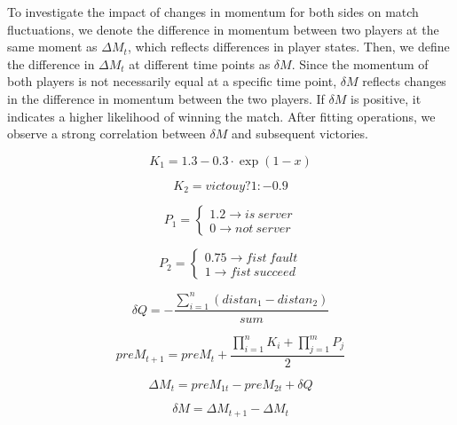 \documentclass[12pt]{article}
\begin{document}
To investigate the impact of changes in momentum for both sides on match fluctuations, we denote the difference in momentum between two players at the same moment as $\Delta M_t$, which reflects differences in player states. Then, we define the difference in $\Delta M_t$ at different time points as $\delta M$. Since the momentum of both players is not necessarily equal at a specific time point, $\delta M$ reflects changes in the difference in momentum between the two players. If $\delta M$ is positive, it indicates a higher likelihood of winning the match. After fitting operations, we observe a strong correlation between $\delta M$ and subsequent victories.

\begin{equation}\label{eq:k1}
K_1=1.3-0.3\cdot\exp\left(1-x\right)
\end{equation}

\begin{equation}\label{eq:k2}
K_2=victouy?1:-0.9
\end{equation}

\begin{equation}\label{eq:p1}
P_1=\left\{
\begin{aligned}
1.2 \to is \ server\\
0 \to not \ server 
\end{aligned}
\right.
\end{equation}

\begin{equation}\label{eq:p2}
P_2 = \left\{
\begin{aligned}
0.75 \to fist \ fault \\
1 \to fist \ succeed 
\end{aligned}
\right.
\end{equation}

\begin{equation}\label{eq:dq}
\delta Q =- \frac {\sum\limits_{i=1}^n (distan_1-distan_2)}{sum}
\end{equation}

\begin{equation}\label{eq:preM}
preM_{t+1}=preM_{t}+\frac{\prod\limits_{i=1}^n K_i+\prod\limits_{j=1}^m P_j}{2}
\end{equation}

\begin{equation}\label{eq:DELM}
\Delta M_t = preM_{1t} - preM _{2t}+\delta Q
\end{equation}

\begin{equation}\label{eq:dDELM}
 \delta M = \Delta M_{t+1}-\Delta M_{t}
\end{equation}
\end{document}
